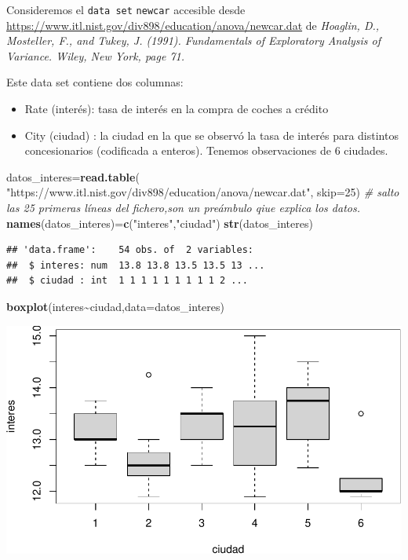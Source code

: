 \documentclass[
]{article}
\newenvironment{Shaded}{\begin{snugshade}}{\end{snugshade}}
\newcommand{\CommentTok}[1]{\textcolor[rgb]{0.56,0.35,0.01}{\textit{#1}}}
\newcommand{\DataTypeTok}[1]{\textcolor[rgb]{0.13,0.29,0.53}{#1}}
\newcommand{\DecValTok}[1]{\textcolor[rgb]{0.00,0.00,0.81}{#1}}
\newcommand{\KeywordTok}[1]{\textcolor[rgb]{0.13,0.29,0.53}{\textbf{#1}}}
\newcommand{\NormalTok}[1]{#1}
\newcommand{\OperatorTok}[1]{\textcolor[rgb]{0.81,0.36,0.00}{\textbf{#1}}}
\newcommand{\StringTok}[1]{\textcolor[rgb]{0.31,0.60,0.02}{#1}}
\providecommand{\tightlist}{%
  \setlength{\itemsep}{0pt}\setlength{\parskip}{0pt}}
\begin{document}
Consideremos el \texttt{data\ set} \texttt{newcar} accesible desde
\url{https://www.itl.nist.gov/div898/education/anova/newcar.dat} de
\emph{Hoaglin, D., Mosteller, F., and Tukey, J. (1991). Fundamentals of
Exploratory Analysis of Variance. Wiley, New York, page 71.}

Este data set contiene dos columnas:

\begin{itemize}
\tightlist
\item
  Rate (interés): tasa de interés en la compra de coches a crédito
\item
  City (ciudad) : la ciudad en la que se observó la tasa de interés para
  distintos concesionarios (codificada a enteros). Tenemos observaciones
  de 6 ciudades.
\end{itemize}

\begin{Shaded}
\begin{Highlighting}[]
\NormalTok{datos\_interes=}\KeywordTok{read.table}\NormalTok{(}
  \StringTok{"https://www.itl.nist.gov/div898/education/anova/newcar.dat"}\NormalTok{,}
  \DataTypeTok{skip=}\DecValTok{25}\NormalTok{)}
\CommentTok{\# salto las 25 primeras líneas del fichero,son un preámbulo qiue explica los datos.}
\KeywordTok{names}\NormalTok{(datos\_interes)=}\KeywordTok{c}\NormalTok{(}\StringTok{"interes"}\NormalTok{,}\StringTok{"ciudad"}\NormalTok{)}
\KeywordTok{str}\NormalTok{(datos\_interes)}
\end{Highlighting}
\end{Shaded}

\begin{verbatim}
## 'data.frame':    54 obs. of  2 variables:
##  $ interes: num  13.8 13.8 13.5 13.5 13 ...
##  $ ciudad : int  1 1 1 1 1 1 1 1 1 2 ...
\end{verbatim}

\begin{Shaded}
\begin{Highlighting}[]
\KeywordTok{boxplot}\NormalTok{(interes}\OperatorTok{\textasciitilde{}}\NormalTok{ciudad,}\DataTypeTok{data=}\NormalTok{datos\_interes)}
\end{Highlighting}
\end{Shaded}

\includegraphics{taller_problemas_resueltos_extra_1_files/figure-latex/unnamed-chunk-20-1.pdf}
\end{document}
